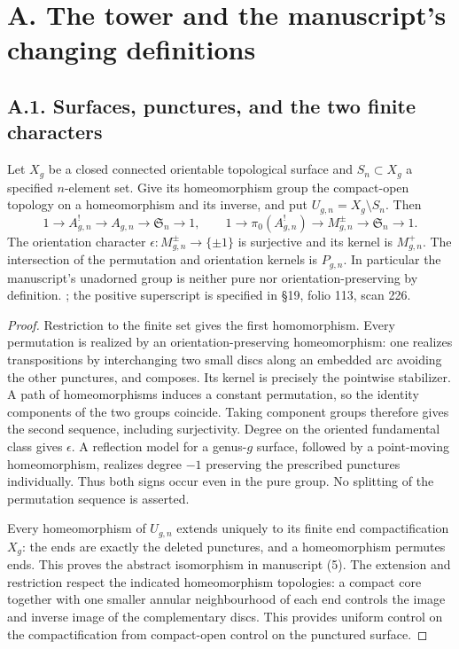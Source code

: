 \section{A. The tower and the manuscript's changing definitions}
\subsection{A.1. Surfaces, punctures, and the two finite characters}

Let $X_g$ be a closed connected orientable topological surface and $S_n\subset X_g$ a specified $n$-element set. Give its homeomorphism group the compact-open topology on a homeomorphism and its inverse, and put $U_{g,n}=X_g\setminus S_n$. Then
\[
1\longrightarrow A^!_{g,n}\longrightarrow A_{g,n}
 \longrightarrow\mathfrak S_n\longrightarrow1,
\qquad
1\longrightarrow\pi_0(A^!_{g,n})\longrightarrow M^{\pm}_{g,n}
 \longrightarrow\mathfrak S_n\longrightarrow1.
\]
The orientation character $\epsilon:M^{\pm}_{g,n}\to\{\pm1\}$ is surjective and its kernel is $M^+_{g,n}$. The intersection of the permutation and orientation kernels is $P_{g,n}$. In particular the manuscript's unadorned group is neither pure nor orientation-preserving by definition.
; the positive superscript is specified in \S19, folio 113, scan 226.
\begin{proof}
Restriction to the finite set gives the first homomorphism. Every permutation is realized by an orientation-preserving homeomorphism: one realizes transpositions by interchanging two small discs along an embedded arc avoiding the other punctures, and composes. Its kernel is precisely the pointwise stabilizer. A path of homeomorphisms induces a constant permutation, so the identity components of the two groups coincide. Taking component groups therefore gives the second sequence, including surjectivity. Degree on the oriented fundamental class gives $\epsilon$. A reflection model for a genus-$g$ surface, followed by a point-moving homeomorphism, realizes degree $-1$ preserving the prescribed punctures individually. Thus both signs occur even in the pure group. No splitting of the permutation sequence is asserted.

Every homeomorphism of $U_{g,n}$ extends uniquely to its finite end compactification $X_g$: the ends are exactly the deleted punctures, and a homeomorphism permutes ends. This proves the abstract isomorphism in manuscript (5). The extension and restriction respect the indicated homeomorphism topologies: a compact core together with one smaller annular neighbourhood of each end controls the image and inverse image of the complementary discs. This provides uniform control on the compactification from compact-open control on the punctured surface.
\end{proof}

